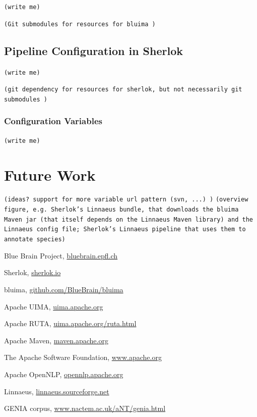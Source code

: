 \documentclass{article}
\newcommand{\TODO}[1]{\texttt{\textcolor{YellowOrange}{(#1)}}} %
\begin{document}
\TODO{write me}

\TODO{Git submodules for resources for bluima }

\subsection{Pipeline Configuration in Sherlok}

\TODO{write me}

\TODO{git dependency for resources for sherlok, but not necessarily git submodules }

\subsubsection{Configuration Variables}

\TODO{write me}

\section{Future Work}

\TODO{ideas? support for more variable url pattern (svn, ...) }
\TODO{overview figure, e.g.  Sherlok's Linnaeus bundle, that downloads the bluima Maven jar (that itself depends on the Linnaeus Maven library) and the Linnaeus config file; Sherlok's Linnaeus pipeline that uses them to annotate species}

\begin{thebibliography}{99}

    Blue Brain Project,
    \href{http://bluebrain.epfl.ch/}{bluebrain.epfl.ch}

    Sherlok,
    \href{http://sherlok.io}{sherlok.io}

    bluima,
    \href{https://github.com/BlueBrain/bluima}{github.com/BlueBrain/bluima}

    Apache UIMA,
    \href{https://uima.apache.org/}{uima.apache.org}

    Apache RUTA,
    \href{https://uima.apache.org/ruta.html}{uima.apache.org/ruta.html}

    Apache Maven,
    \href{https://maven.apache.org/}{maven.apache.org}

    The Apache Software Foundation,
    \href{http://www.apache.org/}{www.apache.org}

    Apache OpenNLP,
    \href{https://opennlp.apache.org/}{opennlp.apache.org}

    Linnaeus,
    \href{http://linnaeus.sourceforge.net/}{linnaeus.sourceforge.net}

    GENIA corpus,
    \href{http://www.nactem.ac.uk/aNT/genia.html}{www.nactem.ac.uk/aNT/genia.html}


\end{thebibliography}

\begin{appendix}
  \listoffigures
  \listoftables
\end{appendix}
\end{document}
